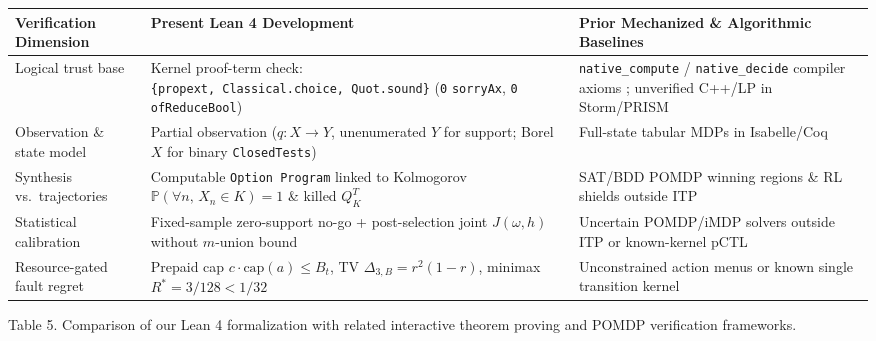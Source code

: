 \documentclass[11pt,a4paper]{article}
\newcounter{none}
\begin{document}
{\def\LTcaptype{none} %
\begin{longtable}[]{@{}
  >{\raggedright\arraybackslash}p{}
  >{\raggedright\arraybackslash}p{}
  >{\raggedright\arraybackslash}p{}@{}}
\toprule\noalign{}
\begin{minipage}[b]{\linewidth}\raggedright
Verification Dimension
\end{minipage} & \begin{minipage}[b]{\linewidth}\raggedright
Present Lean 4 Development
\end{minipage} & \begin{minipage}[b]{\linewidth}\raggedright
Prior Mechanized \& Algorithmic Baselines
\end{minipage} \\
\midrule\noalign{}
\endhead
\bottomrule\noalign{}
\endlastfoot
Logical trust base & Kernel proof-term check:
\texttt{\{propext,\ Classical.choice,\ Quot.sound\}} (\texttt{0}
\texttt{sorryAx}, \texttt{0} \texttt{ofReduceBool}) &
\texttt{native\_compute} / \texttt{native\_decide} compiler axioms
\citep{boespflug2011}; unverified C++/LP in Storm/PRISM
\citep{kwiatkowska2011, dehnert2017} \\
Observation \& state model & Partial observation (\(q: X \to Y\),
unenumerated \(Y\) for support; Borel \(X\) for binary
\texttt{ClosedTests}) & Full-state tabular MDPs in Isabelle/Coq
\citep{hoelzl2017, vajjha2021, schaeffelerAbdulaziz2023} \\
Synthesis vs.~trajectories & Computable \texttt{Option\ Program} linked
to Kolmogorov \(\mathbb{P}(\forall n,\, X_n \in K)=1\) \& killed
\(Q_K^T\) & SAT/BDD POMDP winning regions \& RL shields outside ITP
\citep{chatterjee2016, junges2021, carr2023} \\
Statistical calibration & Fixed-sample zero-support no-go +
post-selection joint \(J(\omega,h)\) without \(m\)-union bound &
Uncertain POMDP/iMDP solvers outside ITP
\citep{cubuktepe2021, badings2023} or known-kernel pCTL
\citep{hoelzlNipkow2012} \\
Resource-gated fault regret & Prepaid cap
\(c\cdot\mathrm{cap}(a)\le B_t\), TV \(\Delta_{3,B}=r^2(1-r)\), minimax
\(R^*=3/128 < 1/32\) & Unconstrained action menus or known single
transition kernel \\
\end{longtable}
}

Table 5. Comparison of our Lean 4 formalization with related interactive
theorem proving and POMDP verification frameworks.
\end{document}
